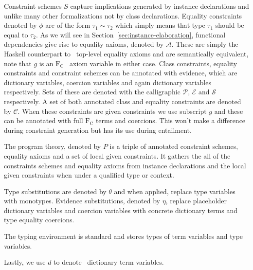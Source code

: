 Constraint schemes $S$ capture implications generated by instance declarations
and unlike many other formalizations not by class declarations. Equality
constraints denoted by $\phi$ are of the form $\tau_1 \sim \tau_2$ which simply
means that type $\tau_1$ should be equal to $\tau_2$. As we will see in
Section~\ref{sec:instance-elaboration}, functional dependencies give rise to
equality axioms, denoted by $\mathcal{A}$. These are simply the Haskell
counterpart to \systemfc ~top-level equality axioms and are semantically
equivalent, note that $g$ is an $\text{F}_\text{C}$  ~axiom variable in either case. Class
constraints, equality constraints and constraint schemes can be annotated with
evidence, which are dictionary variables, coercion variables and again
dictionary variables respectively. Sets of these are denoted with the
calligraphic $\mathcal{P}$, $\mathcal{E}$ and $\mathcal{S}$ respectively. A set
of both annotated class and equality constraints are denoted by $\mathcal{C}$.
When these constraints are given constraints we use subscript $g$ and these can
be annotated with full $\text{F}_\text{C}$ terms and coercions. This won't make
a difference during constraint generation but has its use during entailment.

The program theory, denoted by $P$ is a triple of annotated constraint schemes,
equality axioms and a set of local given constraints. It gathers the all of the
constraints schemes and equality axioms from instance declarations and the local
given constraints when under a qualified type or context.

Type substitutions are denoted by $\theta$ and when applied, replace type
variables with monotypes. Evidence substitutions, denoted by $\eta$, replace
placeholder dictionary variables and coercion variables with concrete dictionary
terms and type equality coercions.

The typing environment is standard and stores types of term variables and type
variables.

Lastly, we use $d$ to denote \systemfc ~dictionary term variables.



